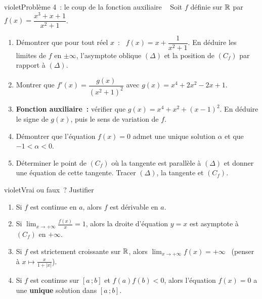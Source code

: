 \begin{exo}{violet}{Problème 4~: le coup de la fonction auxiliaire \demo\ }
Soit $f$ définie sur $\mathbb{R}$ par \ $f(x)=\dfrac{x^3+x+1}{x^2+1}$.
\begin{enumerate}
  \item Démontrer que pour tout réel $x$~: \ $f(x)=x+\dfrac{1}{x^2+1}$. En déduire les limites de $f$ en $\pm\infty$, l'asymptote oblique $(\Delta)$ et la position de $(C_f)$ par rapport à $(\Delta)$.
  \item Montrer que $f'(x)=\dfrac{g(x)}{(x^2+1)^2}$ avec $g(x)=x^4+2x^2-2x+1$.
  \item \textbf{Fonction auxiliaire~:} vérifier que $g(x)=x^4+x^2+(x-1)^2$. En déduire le signe de $g(x)$, puis le sens de variation de $f$.
  \item Démontrer que l'équation $f(x)=0$ admet une unique solution $\alpha$ et que $-1<\alpha<0$.
  \item Déterminer le point de $(C_f)$ où la tangente est parallèle à $(\Delta)$ et donner une équation de cette tangente. Tracer $(\Delta)$, la tangente et $(C_f)$.
\end{enumerate}
\end{exo}

\begin{exo}{violet}{Vrai ou faux~? Justifier \demo\ }
\begin{enumerate}
  \item Si $f$ est continue en $a$, alors $f$ est dérivable en $a$.
  \item Si $\displaystyle\lim_{x\to+\infty}\frac{f(x)}{x}=1$, alors la droite d'équation $y=x$ est asymptote à $(C_f)$ en $+\infty$.
  \item Si $f$ est strictement croissante sur $\mathbb{R}$, alors $\displaystyle\lim_{x\to+\infty}f(x)=+\infty$ \ {\small(penser à $x\mapsto\frac{x}{1+|x|}$)}.
  \item Si $f$ est continue sur $[a\,;b]$ et $f(a)f(b)<0$, alors l'équation $f(x)=0$ a une \textbf{unique} solution dans $[a\,;b]$.
\end{enumerate}
\end{exo}



